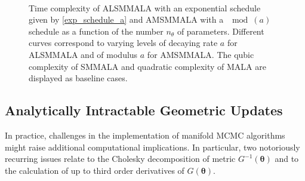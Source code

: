 \documentclass[twoside,11pt]{article}
\begin{document}
\begin{figure}[t]
	\centering
	 \\
	\caption{
		Time complexity of ALSMMALA with an exponential schedule given by \eqref{exp_schedule_a} and AMSMMALA with a $\mod{(a)}$ 
		schedule as a function of the number $n_{\theta}$ of parameters. Different curves correspond to varying levels of 
		decaying rate $a$ for ALSMMALA and of modulus $a$ for AMSMMALA. The qubic complexity of SMMALA and quadratic complexity
		of MALA are displayed as baseline cases.
	}
	\label{fig:alsmmala_amsmmala_schedule}
\end{figure}

\subsection{Analytically Intractable Geometric Updates}

In practice, challenges in the implementation of manifold MCMC algorithms might raise additional computational implications.
In particular, two notoriously recurring issues relate to the Cholesky decomposition of metric $G^{-1}(\boldsymbol{\theta})$ 
and to the calculation of up to third order derivatives of $G(\boldsymbol{\theta})$.
\end{document}
